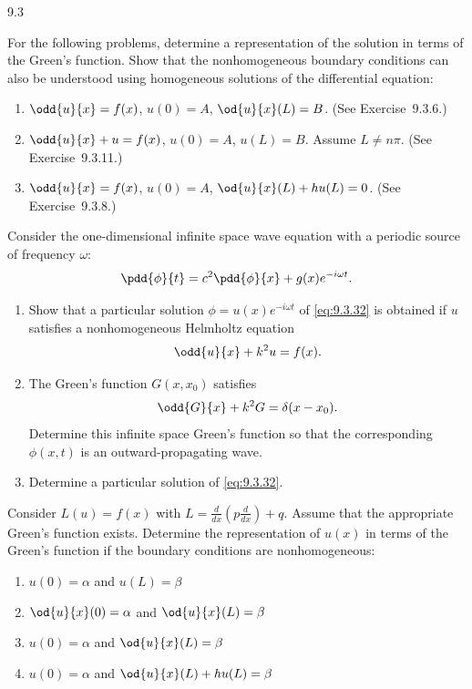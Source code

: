 \begin{exercises}{9.3}
\item For the following problems, determine a representation of the solution in terms of the Green's function.  Show that the nonhomogeneous boundary conditions can also be understood using homogeneous solutions of the differential equation:
\begin{enumerate}
\item[(a)] $\odd{u}{x} = f(x)$, $u(0) = A$, $\od{u}{x}(L) = B$.  (See Exercise~9.3.6.)
\item[(b)] $\odd{u}{x} + u = f(x)$, $u(0) = A$, $u(L) = B$.  Assume $L \neq n\pi$.  (See Exercise~9.3.11.)
\item[(c)] $\odd{u}{x} = f(x)$, $u(0) = A$, $\od{u}{x}(L) + hu(L) = 0$.  (See Exercise~9.3.8.)
\end{enumerate}

\item Consider the one-dimensional infinite space wave equation with a periodic source of frequency $\omega$:
\begin{equation}
\label{eq:9.3.32}
\pdd{\phi}{t} = c^2\pdd{\phi}{x} + g(x)e^{-i\omega t}.
\end{equation}
\begin{enumerate}
\item[(a)] Show that a particular solution $\phi = u(x)e^{-i\omega t}$ of \eqref{eq:9.3.32} is obtained if $u$ satisfies a nonhomogeneous Helmholtz equation
\[
\odd{u}{x} + k^2 u = f(x).
\]
\item[\starred(b)] The Green's function $G(x,x_0)$ satisfies
\[
\odd{G}{x} + k^2 G = \delta(x - x_0).
\]
Determine this infinite space Green's function so that the corresponding $\phi(x,t)$ is an outward-propagating wave.
\item[(c)] Determine a particular solution of \eqref{eq:9.3.32}.
\end{enumerate}

\item Consider $L(u) = f(x)$ with $L = \frac{d}{d x}\!\left(p\frac{d}{d x}\right) + q$.  Assume that the appropriate Green's function exists.  Determine the representation of $u(x)$ in terms of the Green's function if the boundary conditions are nonhomogeneous:
\begin{enumerate}
\item[(a)] $u(0) = \alpha$ and $u(L) = \beta$
\item[(b)] $\od{u}{x}(0) = \alpha$ and $\od{u}{x}(L) = \beta$
\item[(c)] $u(0) = \alpha$ and $\od{u}{x}(L) = \beta$
\item[\starred(d)] $u(0) = \alpha$ and $\od{u}{x}(L) + hu(L) = \beta$
\end{enumerate}


\end{exercises}
